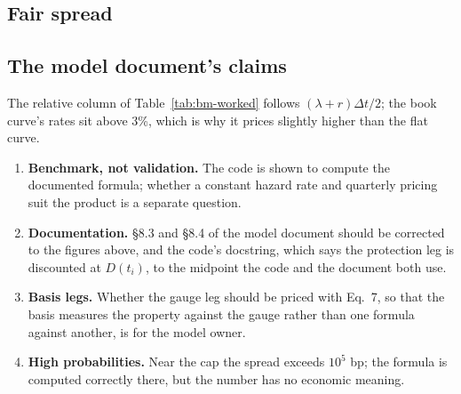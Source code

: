 \documentclass[11pt,a4paper]{article}
\begin{document}
\mkmvalidation



\subsection{Fair spread}


\subsection{The model document's claims}



\noindent The relative column of Table~\ref{tab:bm-worked} follows
$(\lambda+r)\Delta t/2$; the book curve's rates sit above 3\%, which is why it
prices slightly higher than the flat curve.

\mkmlimitations

\begin{enumerate}[leftmargin=*]
\item \textbf{Benchmark, not validation.} The code is shown to compute the
  documented formula; whether a constant hazard rate and quarterly pricing suit
  the product is a separate question.
\item \textbf{Documentation.} \S8.3 and \S8.4 of the model document should be
  corrected to the figures above, and the code's docstring, which says the
  protection leg is discounted at $D(t_i)$, to the midpoint the code and the
  document both use.
\item \textbf{Basis legs.} Whether the gauge leg should be priced with Eq.~7, so
  that the basis measures the property against the gauge rather than one formula
  against another, is for the model owner.
\item \textbf{High probabilities.} Near the cap the spread exceeds $10^5$ bp; the
  formula is computed correctly there, but the number has no economic meaning.
\end{enumerate}

\end{document}
